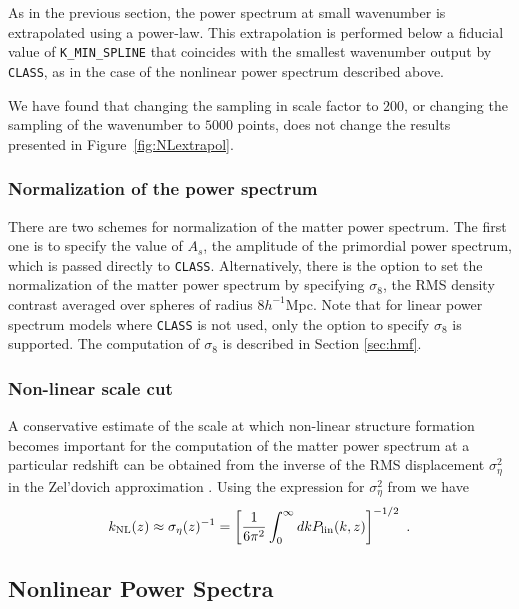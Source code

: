 \documentclass[\docopts]{\docclass}
\begin{document}
As in the previous section, the power spectrum at small wavenumber is extrapolated
using a power-law. This extrapolation is performed below a fiducial value of
{\tt K\_MIN\_SPLINE} that coincides with the smallest wavenumber output by
{\tt CLASS}, as in the case of the nonlinear power spectrum described above.

We have found that changing the sampling in scale factor to $200$, or changing
the sampling of the wavenumber to $5000$ points, does not change the results
presented in Figure~\ref{fig:NLextrapol}.


\subsubsection{Normalization of the power spectrum}
\label{sec:PSnorm}

There are two schemes for normalization of the matter power spectrum. The first
one is to specify the value of $A_s$, the amplitude of the primordial power
spectrum, which is passed directly to {\tt CLASS}. Alternatively, there is the
option to set the normalization of the matter power spectrum by specifying
$\sigma_8$, the RMS density contrast averaged over spheres of radius
$8h^{-1}$Mpc. Note that for linear power spectrum models where {\tt CLASS} is not
used, only the option to specify $\sigma_8$ is supported. The computation of
$\sigma_8$ is described in Section \ref{sec:hmf}.

\subsubsection{Non-linear scale cut}
\label{sec:kNL}

A conservative estimate of the scale at which non-linear structure formation becomes important for the computation of the matter power spectrum at a particular redshift can be obtained from the inverse of the RMS displacement $\sigma_{\eta}^2$ in the Zel'dovich approximation \cite{cosmicvisions2018}. Using the expression for $\sigma_{\eta}^2$ from \cite{white2015} we have
\begin{equation}
k_{\rm NL}(z) \approx \sigma_{\eta}(z)^{-1}=\left[ \frac{1}{6\pi^2} \int^{\infty}_0 dk P_{\rm lin}(k,z) \right]^{-1/2}~.
\end{equation}

\subsection{Nonlinear Power Spectra}
\label{sec:Nonlinear_Pk}
\end{document}
